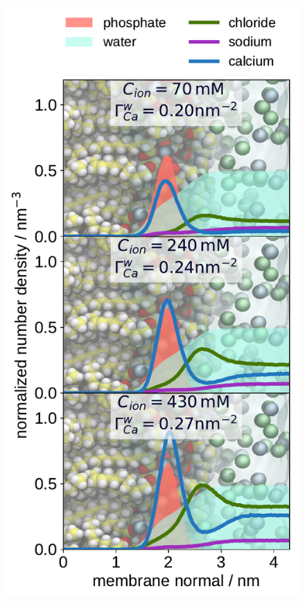\begin{figure}[htbp!] 
  \centering 
  \includegraphics[width=\figwidth]{../img/ecc_pops/density_profiles_ca_na_cl_wat_phos_models-compar_1-3_CaCl2-series.pdf}

\end{figure}
